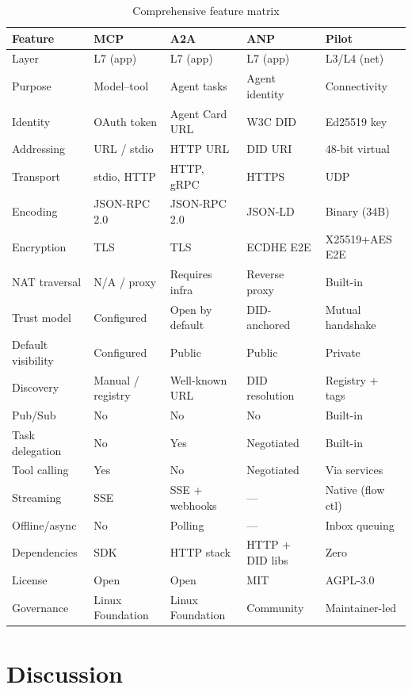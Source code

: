 \documentclass[11pt,a4paper]{article}
\begin{document}
\begin{table}[h]
\centering
\caption{Comprehensive feature matrix}
\label{tab:matrix}
\small
\begin{tabular}{@{}L{2.8cm}L{2.5cm}L{2.5cm}L{2.5cm}L{2.5cm}@{}}
\toprule
\textbf{Feature} & \textbf{MCP} & \textbf{A2A} & \textbf{ANP} & \textbf{Pilot} \\
\midrule
Layer & L7 (app) & L7 (app) & L7 (app) & L3/L4 (net) \\
Purpose & Model--tool & Agent tasks & Agent identity & Connectivity \\
Identity & OAuth token & Agent Card URL & W3C DID & Ed25519 key \\
Addressing & URL / stdio & HTTP URL & DID URI & 48-bit virtual \\
Transport & stdio, HTTP & HTTP, gRPC & HTTPS & UDP \\
Encoding & JSON-RPC 2.0 & JSON-RPC 2.0 & JSON-LD & Binary (34B) \\
Encryption & TLS & TLS & ECDHE E2E & X25519+AES E2E \\
NAT traversal & N/A / proxy & Requires infra & Reverse proxy & Built-in \\
Trust model & Configured & Open by default & DID-anchored & Mutual handshake \\
Default visibility & Configured & Public & Public & Private \\
Discovery & Manual / registry & Well-known URL & DID resolution & Registry + tags \\
Pub/Sub & No & No & No & Built-in \\
Task delegation & No & Yes & Negotiated & Built-in \\
Tool calling & Yes & No & Negotiated & Via services \\
Streaming & SSE & SSE + webhooks & --- & Native (flow ctl) \\
Offline/async & No & Polling & --- & Inbox queuing \\
Dependencies & SDK & HTTP stack & HTTP + DID libs & Zero \\
License & Open & Open & MIT & AGPL-3.0 \\
Governance & Linux Foundation & Linux Foundation & Community & Maintainer-led \\
\bottomrule
\end{tabular}
\end{table}

\section{Discussion}
\end{document}
